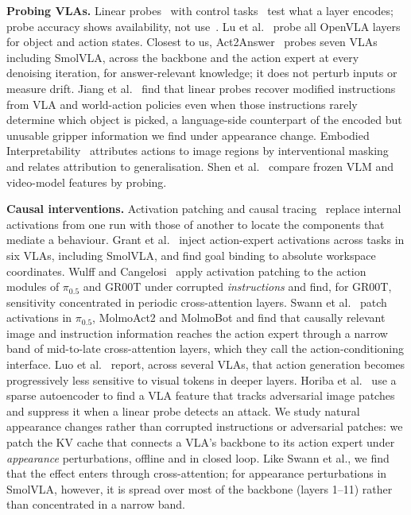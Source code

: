 \documentclass[conference]{IEEEtran}
\begin{document}
\textbf{Probing VLAs.} Linear probes~\cite{alain2016probes} with control tasks~\cite{hewitt2019control} test what a layer encodes; probe accuracy shows availability, not use~\cite{belinkov2022probing}. Lu et al.~\cite{lu2025probing} probe all OpenVLA layers for object and action states. Closest to us, Act2Answer~\cite{kachaev2026act2answer} probes seven VLAs including SmolVLA, across the backbone and the action expert at every denoising iteration, for answer-relevant knowledge; it does not perturb inputs or measure drift. Jiang et al.~\cite{jiang2026encoded} find that linear probes recover modified instructions from VLA and world-action policies even when those instructions rarely determine which object is picked, a language-side counterpart of the encoded but unusable gripper information we find under appearance change. Embodied Interpretability~\cite{zhang2026embodied} attributes actions to image regions by interventional masking and relates attribution to generalisation. Shen et al.~\cite{shen2026pretraining} compare frozen VLM and video-model features by probing.

\textbf{Causal interventions.} Activation patching and causal tracing~\cite{meng2022rome,zhang2024patching} replace internal activations from one run with those of another to locate the components that mediate a behaviour. Grant et al.~\cite{grant2026features} inject action-expert activations across tasks in six VLAs, including SmolVLA, and find goal binding to absolute workspace coordinates. Wulff and Cangelosi~\cite{wulff2026instructions} apply activation patching to the action modules of $\pi_{0.5}$ and GR00T under corrupted \emph{instructions} and find, for GR00T, sensitivity concentrated in periodic cross-attention layers. Swann et al.~\cite{swann2026causal} patch activations in $\pi_{0.5}$, MolmoAct2 and MolmoBot and find that causally relevant image and instruction information reaches the action expert through a narrow band of mid-to-late cross-attention layers, which they call the action-conditioning interface. Luo et al.~\cite{luo2026lookbefore} report, across several VLAs, that action generation becomes progressively less sensitive to visual tokens in deeper layers. Horiba et al.~\cite{horiba2026detect} use a sparse autoencoder to find a VLA feature that tracks adversarial image patches and suppress it when a linear probe detects an attack. We study natural appearance changes rather than corrupted instructions or adversarial patches: we patch the KV cache that connects a VLA's backbone to its action expert under \emph{appearance} perturbations, offline and in closed loop. Like Swann et al., we find that the effect enters through cross-attention; for appearance perturbations in SmolVLA, however, it is spread over most of the backbone (layers 1--11) rather than concentrated in a narrow band.
\end{document}
